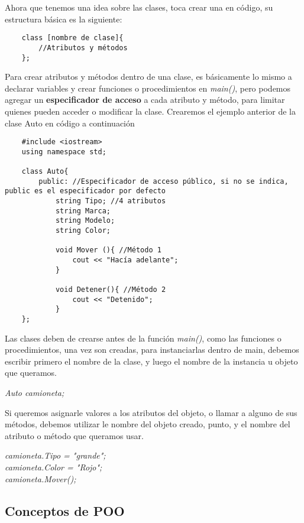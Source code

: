 Ahora que tenemos una idea sobre las clases, toca crear una en código, su estructura básica es la siguiente:
\begin{lstlisting}
    class [nombre de clase]{
        //Atributos y métodos
    };
\end{lstlisting}

Para crear atributos y métodos dentro de una clase, es básicamente lo mismo a declarar variables y crear funciones o procedimientos en \textit{main()}, pero podemos agregar un \textbf{especificador de acceso} a cada atributo y método, para limitar quienes pueden acceder o modificar la clase. Crearemos el ejemplo anterior de la clase Auto en código a continuación
\begin{lstlisting}
    #include <iostream>
    using namespace std;

    class Auto{
        public: //Especificador de acceso público, si no se indica, public es el especificador por defecto
            string Tipo; //4 atributos
            string Marca;
            string Modelo;
            string Color;
            
            void Mover (){ //Método 1
                cout << "Hacía adelante";
            }
            
            void Detener(){ //Método 2
                cout << "Detenido";
            }
    };
\end{lstlisting}

Las clases deben de crearse antes de la función \textit{main()}, como las funciones o procedimientos, una vez son creadas, para instanciarlas dentro de main, debemos escribir primero el nombre de la clase, y luego el nombre de la instancia u objeto que queramos.
\begin{center}
    \textit{Auto camioneta;}
\end{center}

Si queremos asignarle valores a los atributos del objeto, o llamar a alguno de sus métodos, debemos utilizar le nombre del objeto creado, punto, y el nombre del atributo o método que queramos usar.
\begin{center}
    \textit{
        camioneta.Tipo = "grande"; \\
        camioneta.Color = "Rojo"; \\
        camioneta.Mover();
    }
\end{center}


\subsection{Conceptos de POO}


